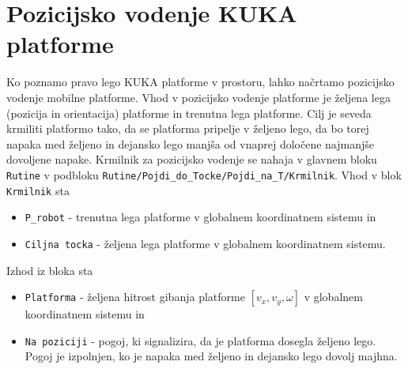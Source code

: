 \section{Pozicijsko vodenje KUKA platforme}

Ko poznamo pravo lego KUKA platforme v prostoru, lahko načrtamo pozicijsko vodenje mobilne platforme. Vhod v pozicijsko vodenje platforme je željena lega (pozicija in orientacija) platforme in trenutna lega platforme. Cilj je seveda krmiliti platformo tako, da se platforma pripelje v željeno lego, da bo torej napaka med željeno in dejansko lego manjša od vnaprej določene najmanjše dovoljene napake. Krmilnik za pozicijsko vodenje se nahaja v glavnem bloku \verb"Rutine" v podbloku \newline \verb"Rutine/Pojdi_do_Tocke/Pojdi_na_T/Krmilnik". Vhod v blok \verb"Krmilnik" sta
\begin{itemize}
\item \verb"P_robot" - trenutna lega platforme v globalnem koordinatnem sistemu in
\item \verb"Ciljna tocka" - željena lega platforme v globalnem koordinatnem sistemu.
\end{itemize}

Izhod iz bloka sta
\begin{itemize}
\item \verb"Platforma" - željena hitrost gibanja platforme $[v_x,v_y,\omega]$ v globalnem koordinatnem sistemu in
\item \verb"Na poziciji" - pogoj, ki signalizira, da je platforma dosegla željeno lego. Pogoj je izpolnjen, ko je napaka med željeno in dejansko lego dovolj majhna.
\end{itemize}


